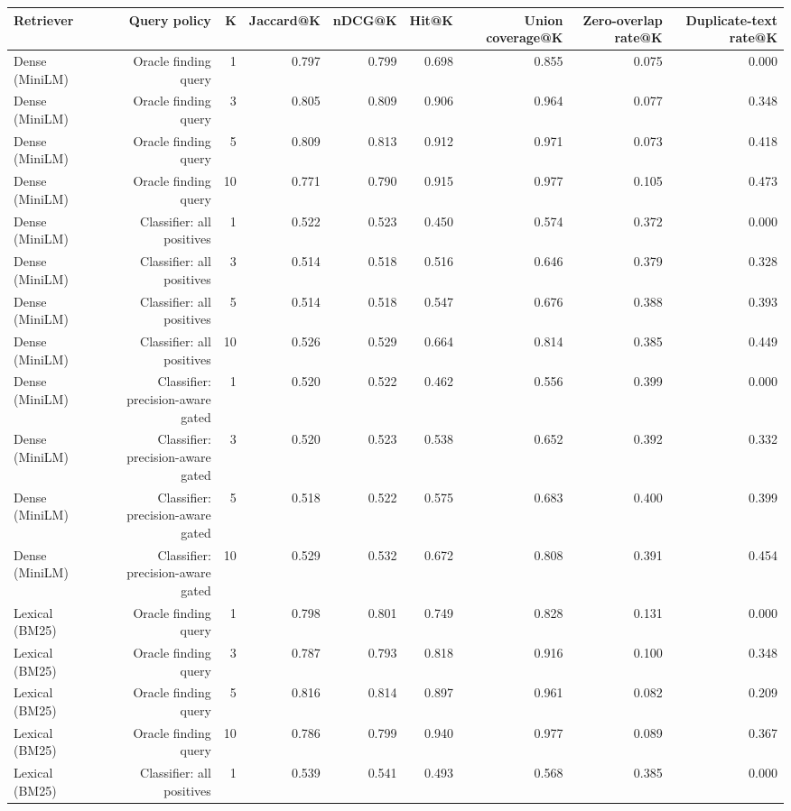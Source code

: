 \begin{table}[t]
\centering
\scriptsize
\begin{tabular}{lrrrrrrrr}
\hline
Retriever & Query policy & K & Jaccard@K & nDCG@K & Hit@K & Union coverage@K & Zero-overlap rate@K & Duplicate-text rate@K \\
\hline
Dense (MiniLM) & Oracle finding query & 1 & 0.797 & 0.799 & 0.698 & 0.855 & 0.075 & 0.000 \\
Dense (MiniLM) & Oracle finding query & 3 & 0.805 & 0.809 & 0.906 & 0.964 & 0.077 & 0.348 \\
Dense (MiniLM) & Oracle finding query & 5 & 0.809 & 0.813 & 0.912 & 0.971 & 0.073 & 0.418 \\
Dense (MiniLM) & Oracle finding query & 10 & 0.771 & 0.790 & 0.915 & 0.977 & 0.105 & 0.473 \\
Dense (MiniLM) & Classifier: all positives & 1 & 0.522 & 0.523 & 0.450 & 0.574 & 0.372 & 0.000 \\
Dense (MiniLM) & Classifier: all positives & 3 & 0.514 & 0.518 & 0.516 & 0.646 & 0.379 & 0.328 \\
Dense (MiniLM) & Classifier: all positives & 5 & 0.514 & 0.518 & 0.547 & 0.676 & 0.388 & 0.393 \\
Dense (MiniLM) & Classifier: all positives & 10 & 0.526 & 0.529 & 0.664 & 0.814 & 0.385 & 0.449 \\
Dense (MiniLM) & Classifier: precision-aware gated & 1 & 0.520 & 0.522 & 0.462 & 0.556 & 0.399 & 0.000 \\
Dense (MiniLM) & Classifier: precision-aware gated & 3 & 0.520 & 0.523 & 0.538 & 0.652 & 0.392 & 0.332 \\
Dense (MiniLM) & Classifier: precision-aware gated & 5 & 0.518 & 0.522 & 0.575 & 0.683 & 0.400 & 0.399 \\
Dense (MiniLM) & Classifier: precision-aware gated & 10 & 0.529 & 0.532 & 0.672 & 0.808 & 0.391 & 0.454 \\
Lexical (BM25) & Oracle finding query & 1 & 0.798 & 0.801 & 0.749 & 0.828 & 0.131 & 0.000 \\
Lexical (BM25) & Oracle finding query & 3 & 0.787 & 0.793 & 0.818 & 0.916 & 0.100 & 0.348 \\
Lexical (BM25) & Oracle finding query & 5 & 0.816 & 0.814 & 0.897 & 0.961 & 0.082 & 0.209 \\
Lexical (BM25) & Oracle finding query & 10 & 0.786 & 0.799 & 0.940 & 0.977 & 0.089 & 0.367 \\
Lexical (BM25) & Classifier: all positives & 1 & 0.539 & 0.541 & 0.493 & 0.568 & 0.385 & 0.000 \\

\end{tabular}
\end{table}
